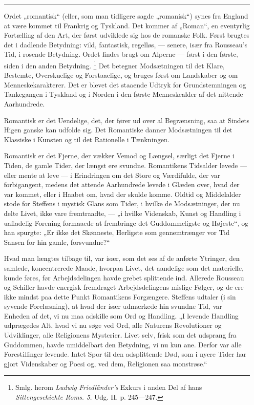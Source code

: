 \documentclass[12pt,a4paper,openany]{book}
\newcommand{\opage}[1]{\marginnote{\footnotesize\textit{[#1]}}}
\begin{document}
\begin{center}\rule{2cm}{0.4pt}\end{center}

Ordet „romantisk“ (eller, som man tidligere sagde „romanisk“) synes fra England
at være kommet til Frankrig og Tyskland. Det kommer af „Roman“, en eventyrlig
Fortælling af den Art, der først udviklede sig hos de romanske Folk. Først
brugtes det i dadlende Betydning: vild, fantastisk, regelløs, --- senere, især
fra Rousseau's Tid, i rosende Betydning. Ordet findes brugt om Alperne ---
først i den første, siden i den anden Betydning.%
\footnote[1]{Smlg. herom \emph{Ludwig} \emph{Friedländer's} Exkurs i anden Del
af hans \textit{Sittengeschichte Roms. 5.} Udg. II. p. 245---247.} Det betegner
Modsætningen til det Klare, Bestemte, Overskuelige og Forstaaelige, og bruges
først om Landskaber og om Menneskekarakterer. Det er blevet det staaende Udtryk
for Grundstemningen og Tankegangen i Tyskland og i Norden i den første
Menneskealder af det nittende Aarhundrede.

Romantisk er det Uendelige, det, der fører ud over al Begrænsning, saa at
Sindets Higen ganske kan udfolde sig. Det
\setcounter{footnote}{0}%
\opage{43}Romantiske danner Modsætningen til det Klassiske i Kunsten og til det
Rationelle i Tænkningen.

Romantisk er det Fjerne, der vækker Vemod og Længsel, særligt det Fjerne i
Tiden, de gamle Tider, der længst ere svundne. Romantikens Tidsalder levede ---
eller mente at leve --- i Erindringen om det Store og Værdifulde, der var
forbigangent, medens det attende Aarhundrede levede i Glæden over, hvad der var
kommet, eller i Haabet om, hvad der skulde komme. Oldtid og Middelalder stode
for Steffens i mystisk Glans som Tider, i hvilke de Modsætninger, der nu delte
Livet, ikke vare fremtraadte, --- „i hvilke Videnskab, Kunst og Handling i
uafladelig Forening formaaede at frembringe det Guddommeligste og Højeste“, og
han spurgte: „Er ikke det Skønneste, Herligste som gennemtrænger vor Tid Sansen
for hin gamle, forsvundne?“

Hvad man længtes tilbage til, var især, som det ses af de anførte Ytringer, den
samlede, koncentrerede Maade, hvorpaa Livet, det aandelige som det materielle,
kunde føres, før Arbejdsdelingen havde grebet splittende ind. Allerede Rousseau
og Schiller havde energisk fremdraget Arbejdsdelingens mislige Følger, og de
ere ikke mindst paa dette Punkt Romantikens Forgængere. Steffens udtaler (i sin
syvende Forelæsning), at hvad der især udmærkede hin svundne Tid, var Enheden
af det, vi nu maa adskille som Ord og Handling. „I levende Handling udprægedes
Alt, hvad vi nu søge ved Ord, alle Naturens Revolutioner og Udviklinger, alle
Religionens Mysterier. Livet selv, frisk som det udsprang fra Guddommen, havde
umiddelbart den Betydning, vi nu kun ane. Derfor var alle Forestillinger
levende. Intet Spor til den adsplittende Død, som i nyere Tider har gjort
Videnskaber og Poesi og, ved dem, Religionen saa monstrøse.“
\end{document}
